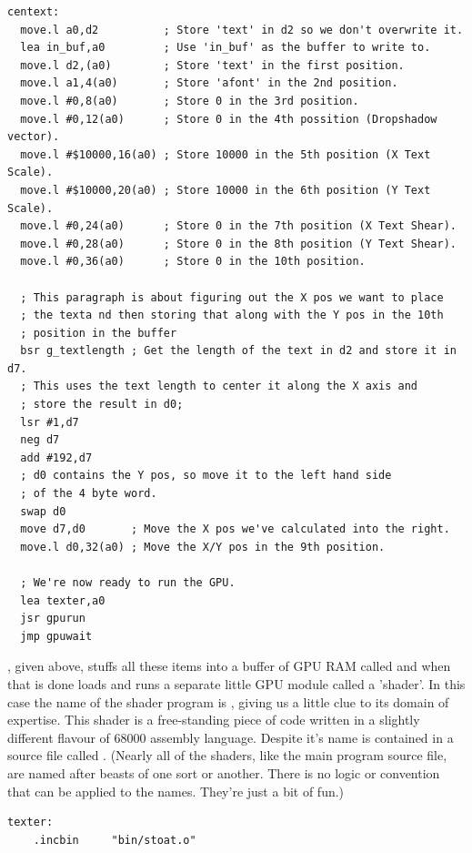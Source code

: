 \begin{lstlisting}[caption=The \icode{centext} routine responsible for setting up the values in our GPU buffer.]
centext:
  move.l a0,d2          ; Store 'text' in d2 so we don't overwrite it.
  lea in_buf,a0         ; Use 'in_buf' as the buffer to write to.
  move.l d2,(a0)        ; Store 'text' in the first position.
  move.l a1,4(a0)       ; Store 'afont' in the 2nd position.
  move.l #0,8(a0)       ; Store 0 in the 3rd position.
  move.l #0,12(a0)      ; Store 0 in the 4th possition (Dropshadow vector).
  move.l #$10000,16(a0) ; Store 10000 in the 5th position (X Text Scale).
  move.l #$10000,20(a0) ; Store 10000 in the 6th position (Y Text Scale).
  move.l #0,24(a0)      ; Store 0 in the 7th position (X Text Shear).
  move.l #0,28(a0)      ; Store 0 in the 8th position (Y Text Shear).
  move.l #0,36(a0)      ; Store 0 in the 10th position.

  ; This paragraph is about figuring out the X pos we want to place
  ; the texta nd then storing that along with the Y pos in the 10th
  ; position in the buffer
  bsr g_textlength ; Get the length of the text in d2 and store it in d7.     
  ; This uses the text length to center it along the X axis and
  ; store the result in d0;
  lsr #1,d7             
  neg d7
  add #192,d7
  ; d0 contains the Y pos, so move it to the left hand side
  ; of the 4 byte word.
  swap d0               
  move d7,d0       ; Move the X pos we've calculated into the right.
  move.l d0,32(a0) ; Move the X/Y pos in the 9th position.

  ; We're now ready to run the GPU.
  lea texter,a0
  jsr gpurun
  jmp gpuwait
\end{lstlisting}

, given above, stuffs all these items into a buffer of GPU RAM called  and when that is done
loads and runs a separate little GPU module called a 'shader'. In this case the name of the shader program is ,
giving us a little clue to its domain of expertise. This shader is a free-standing piece of code written in a slightly different
flavour of 68000 assembly language. Despite it's name  is contained in a source file called . (Nearly
all of the shaders, like the main program source file, are named after beasts of one sort or another. There is no logic or convention
that can be applied to the names. They're just a bit of fun.)

\begin{lstlisting}
texter:
	.incbin 	"bin/stoat.o"
\end{lstlisting}

